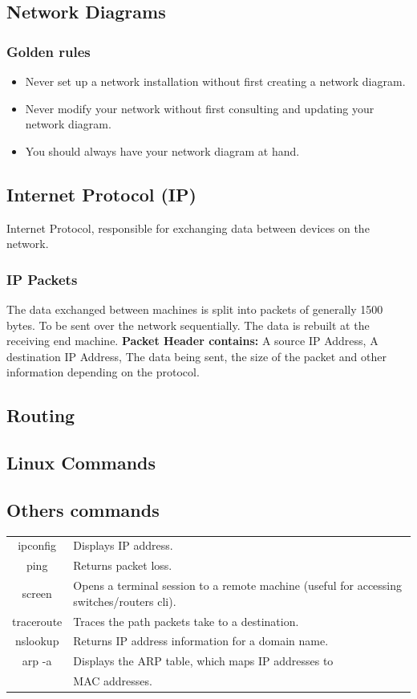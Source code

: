 \documentclass[5pt]{article}
\begin{document}
\begin{multicols}{2}
\subsection{Network Diagrams}
\subsubsection{Golden rules}
\begin{itemize}
  \item Never set up a network installation without first creating a network diagram.
  \item Never modify your network without first consulting and updating your network diagram.
  \item You should always have your network diagram at hand.
\end{itemize}

\subsection{Internet Protocol (IP)}
Internet Protocol, responsible for exchanging data between devices on the network.
\subsubsection{IP Packets}
The data exchanged between machines is split into packets of generally 1500 bytes. To be sent over the network sequentially. 
The data is rebuilt at the receiving end machine. 
\textbf{Packet Header contains:} A source IP Address, A destination IP Address, The data being sent, the size of the packet and other information depending on the protocol.


\subsection{Routing}


\subsection{Linux  Commands}


\subsection{Others commands}
\begin{tabular}{C L}
  ipconfig    & Displays IP address.\\
  ping        & Returns packet loss.\\
  screen      & Opens a terminal session to a remote machine (useful for accessing switches/routers cli).\\
  traceroute  & Traces the path packets take to a destination.\\
  nslookup    & Returns IP address information for a domain name.\\
  arp -a      & Displays the ARP table, which maps IP addresses to\\
              & MAC addresses.\\
\end{tabular}


\end{multicols}
\end{document}
